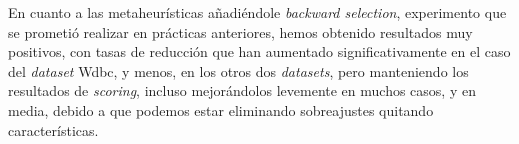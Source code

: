 \documentclass[a4paper,11pt]{article}
\begin{document}
  En cuanto a las metaheurísticas añadiéndole \textit{backward selection}, experimento que se prometió realizar en prácticas
  anteriores, hemos obtenido resultados muy positivos, con tasas de reducción que han aumentado significativamente en el caso
  del \textit{dataset} Wdbc, y menos, en los otros dos \textit{datasets}, pero manteniendo los resultados de \textit{scoring},
  incluso mejorándolos levemente en muchos casos, y en media, debido a que podemos estar eliminando sobreajustes quitando
  características.
  
\end{document}
